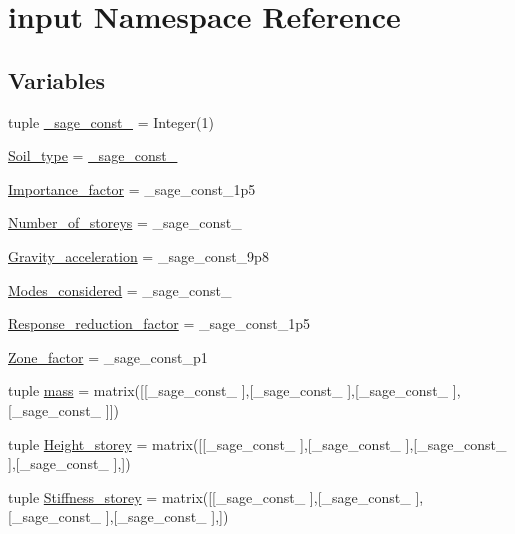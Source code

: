 \hypertarget{namespaceinput}{}\section{input Namespace Reference}
\label{namespaceinput}
\subsection*{Variables}
\begin{DoxyCompactItemize}
\item 
tuple \hyperlink{namespaceinput_a221dbe0b6723929966d68d807eb5b2db}{\+\_\+sage\+\_\+const\+\_} = Integer(1)
\item 
\hyperlink{namespaceinput_a6221ae01cf2fb9e8cd22204749785a0e}{Soil\+\_\+type} = \hyperlink{namespaceinput_a221dbe0b6723929966d68d807eb5b2db}{\+\_\+sage\+\_\+const\+\_}
\item 
\hyperlink{namespaceinput_a0840d963ea24db338f3ab4457defb494}{Importance\+\_\+factor} = \+\_\+sage\+\_\+const\+\_\+1p5
\item 
\hyperlink{namespaceinput_a10237b312ba44e8c8090db86059c5803}{Number\+\_\+of\+\_\+storeys} = \+\_\+sage\+\_\+const\+\_
\item 
\hyperlink{namespaceinput_a55ab15c1c171513e99332aa50c723764}{Gravity\+\_\+acceleration} = \+\_\+sage\+\_\+const\+\_\+9p8
\item 
\hyperlink{namespaceinput_adb7aca4735796aaa4a46456d3edeac2e}{Modes\+\_\+considered} = \+\_\+sage\+\_\+const\+\_
\item 
\hyperlink{namespaceinput_aa6d0078a6d934c0d515d85059525e938}{Response\+\_\+reduction\+\_\+factor} = \+\_\+sage\+\_\+const\+\_\+1p5
\item 
\hyperlink{namespaceinput_aeea70e58ec9bb0d3d6c4363867eb0f82}{Zone\+\_\+factor} = \+\_\+sage\+\_\+const\+\_\+p1
\item 
tuple \hyperlink{namespaceinput_af91e2c1a9ecd07a9c8dcf3a5fc8b2b60}{mass} = matrix(\mbox{[}\mbox{[}\+\_\+sage\+\_\+const\+\_ \mbox{]},\mbox{[}\+\_\+sage\+\_\+const\+\_ \mbox{]},\mbox{[}\+\_\+sage\+\_\+const\+\_ \mbox{]},\mbox{[}\+\_\+sage\+\_\+const\+\_ \mbox{]}\mbox{]})
\item 
tuple \hyperlink{namespaceinput_a01ad5b8730285b6aaebb2bc3f3fc0894}{Height\+\_\+storey} = matrix(\mbox{[}\mbox{[}\+\_\+sage\+\_\+const\+\_ \mbox{]},\mbox{[}\+\_\+sage\+\_\+const\+\_ \mbox{]},\mbox{[}\+\_\+sage\+\_\+const\+\_ \mbox{]},\mbox{[}\+\_\+sage\+\_\+const\+\_ \mbox{]},\mbox{]})
\item 
tuple \hyperlink{namespaceinput_a3853184afbe677b2a218690766c4f5e4}{Stiffness\+\_\+storey} = matrix(\mbox{[}\mbox{[}\+\_\+sage\+\_\+const\+\_ \mbox{]},\mbox{[}\+\_\+sage\+\_\+const\+\_ \mbox{]},\mbox{[}\+\_\+sage\+\_\+const\+\_ \mbox{]},\mbox{[}\+\_\+sage\+\_\+const\+\_ \mbox{]},\mbox{]})
\end{DoxyCompactItemize}


